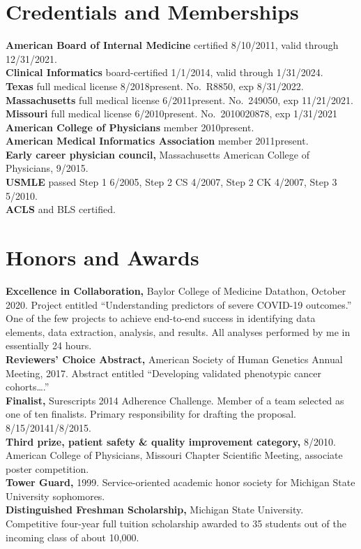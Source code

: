 \documentclass[10pt]{article}
\begin{document}
\section*{Credentials and Memberships}
\textbf{American Board of Internal Medicine} certified 8/10/2011,
valid through 12/31/2021.\\
\textbf{Clinical Informatics} board-certified 1/1/2014, valid through
1/31/2024.\\
\textbf{Texas} full medical license 8/2018\ndash{}present. No.\ R8850,
exp 8/31/2022.\\
\textbf{Massachusetts} full medical license 6/2011\ndash{}present.
No.\ 249050, exp 11/21/2021.\\
\textbf{Missouri} full medical license 6/2010\ndash{}present. No.\ 2010020878, exp 1/31/2021\\
\textbf{American College of Physicians} member 2010\ndash{}present.\\
\textbf{American Medical Informatics Association} member
2011\ndash{}present.\\
\textbf{Early career physician council,} Massachusetts American
College of Physicians, 9/\ndash{}2015.\\
\textbf{USMLE} passed Step 1 6/2005, Step 2 CS 4/2007, Step 2 CK
4/2007, Step 3 5/2010.\\
\textbf{ACLS} and BLS certified.




\section*{Honors and Awards}

\textbf{Excellence in Collaboration,} Baylor College of Medicine
Datathon, October 2020. Project entitled ``Understanding predictors of
severe COVID-19 outcomes.'' One of the few projects to achieve
end-to-end success in identifying data elements, data extraction,
analysis, and results. All analyses performed by me in essentially 24
hours.\\
\textbf{Reviewers' Choice Abstract,} American Society of Human
Genetics Annual Meeting, 2017. Abstract entitled ``Developing
validated phenotypic cancer cohorts\ldots{}.''\\
\textbf{Finalist,} Surescripts 2014 Adherence Challenge. Member of a
team selected as one of ten finalists. Primary responsibility for
drafting the proposal. 8/15/2014\ndash{}1/8/2015.\\
\textbf{Third prize, patient safety \& quality improvement category,}
8/2010. American College of Physicians, Missouri Chapter Scientific
Meeting, associate poster competition.\\
\textbf{Tower Guard,} 1999. Service-oriented academic honor
society for Michigan State University sophomores.\\
\textbf{Distinguished Freshman Scholarship,} Michigan State
University. Competitive four-year full tuition scholarship awarded to
35 students out of the incoming class of about 10,000.
\end{document}
